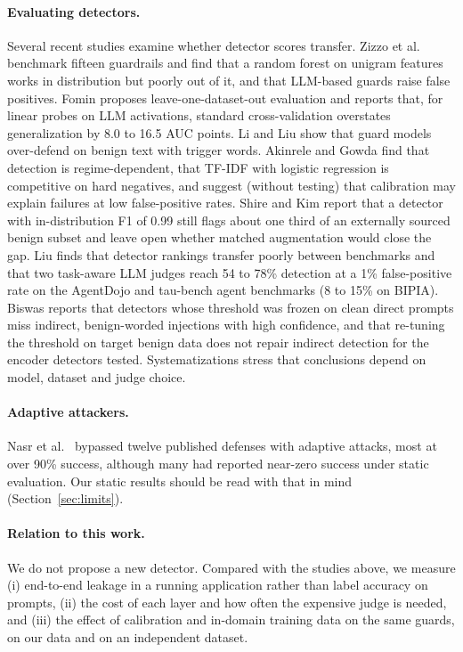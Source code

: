 \documentclass[11pt]{article}
\begin{document}
\paragraph{Evaluating detectors.} Several recent studies examine whether detector scores transfer.
Zizzo et al.\ \cite{zizzo2025adversarial} benchmark fifteen guardrails and find that a random forest on unigram features
works in distribution but poorly out of it, and that LLM-based guards raise false positives. Fomin \cite{fomin2026benchmarks}
proposes leave-one-dataset-out evaluation and reports that, for linear probes on LLM activations, standard cross-validation overstates generalization by 8.0 to 16.5 AUC points.
Li and Liu \cite{li2024injecguard} show that guard models over-defend on benign text with trigger words.
Akinrele and Gowda \cite{akinrele2026regime} find that detection is regime-dependent, that TF-IDF with logistic
regression is competitive on hard negatives, and suggest (without testing) that calibration may explain failures
at low false-positive rates. Shire and Kim \cite{shire2026pids} report that a detector with in-distribution F1 of 0.99 still
flags about one third of an externally sourced benign subset and leave open whether matched augmentation would close the gap.
Liu \cite{liu2026passing} finds that detector rankings transfer poorly between benchmarks and that two task-aware LLM judges reach 54 to 78\%
detection at a 1\% false-positive rate on the AgentDojo and tau-bench agent benchmarks (8 to 15\% on BIPIA).
Biswas \cite{biswas2026confidently} reports that detectors whose threshold was frozen on clean direct prompts miss indirect, benign-worded injections with high confidence, and that re-tuning the threshold on target benign data does not repair indirect detection for the encoder detectors tested. Systematizations \cite{hong2025sok} stress that conclusions depend on model, dataset and judge choice.
\paragraph{Adaptive attackers.} Nasr et al.\ \cite{nasr2025attacker} bypassed twelve published defenses with adaptive
attacks, most at over 90\% success, although many had reported near-zero success under static evaluation. Our static results
should be read with that in mind (Section~\ref{sec:limits}).
\paragraph{Relation to this work.} We do not propose a new detector. Compared with the studies above, we measure
(i) end-to-end leakage in a running application rather than label accuracy on prompts, (ii) the cost of each layer
and how often the expensive judge is needed, and (iii) the effect of calibration and in-domain training data on the
same guards, on our data and on an independent dataset.
\end{document}
